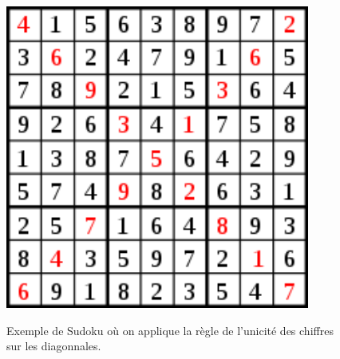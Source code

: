 \begin{figure}[!h]
\centering
\includegraphics[width=10cm]{./images/Sudoku_Special.png}\label{Sudoku_Special}
\caption{Exemple de Sudoku où on applique la règle de l'unicité des chiffres sur les diagonnales.}
\end{figure}
